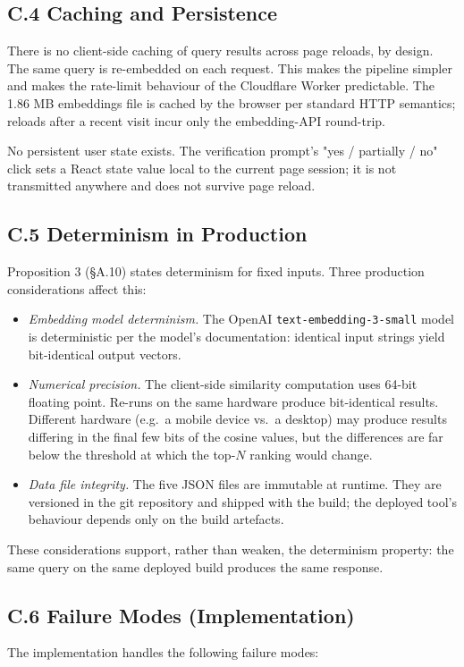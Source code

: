 \documentclass[11pt]{article}
\begin{document}
\subsection*{C.4 Caching and Persistence}
There is no client-side caching of query results across page reloads, by design. The same query is re-embedded on each request. This makes the pipeline simpler and makes the rate-limit behaviour of the Cloudflare Worker predictable. The 1.86 MB embeddings file is cached by the browser per standard HTTP semantics; reloads after a recent visit incur only the embedding-API round-trip.

No persistent user state exists. The verification prompt's "yes / partially / no" click sets a React state value local to the current page session; it is not transmitted anywhere and does not survive page reload.

\subsection*{C.5 Determinism in Production}
Proposition 3 (\S A.10) states determinism for fixed inputs. Three production considerations affect this:

\begin{itemize}[leftmargin=2em,itemsep=0.2em]
\item \emph{Embedding model determinism.} The OpenAI \texttt{text-embedding-3-small} model is deterministic per the model's documentation: identical input strings yield bit-identical output vectors.
\item \emph{Numerical precision.} The client-side similarity computation uses 64-bit floating point. Re-runs on the same hardware produce bit-identical results. Different hardware (e.g.\ a mobile device vs.\ a desktop) may produce results differing in the final few bits of the cosine values, but the differences are far below the threshold at which the top-$N$ ranking would change.
\item \emph{Data file integrity.} The five JSON files are immutable at runtime. They are versioned in the git repository and shipped with the build; the deployed tool's behaviour depends only on the build artefacts.
\end{itemize}

These considerations support, rather than weaken, the determinism property: the same query on the same deployed build produces the same response.

\subsection*{C.6 Failure Modes (Implementation)}
The implementation handles the following failure modes:
\end{document}
